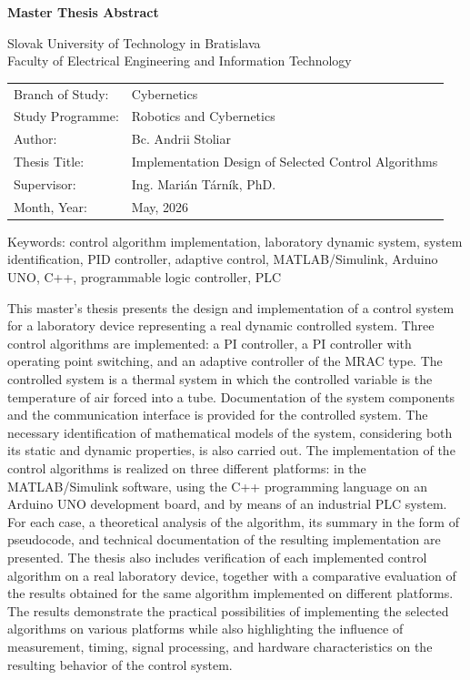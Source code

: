 \thispagestyle{empty}

\noindent 
\textsf{\textbf{\Large Master Thesis Abstract}}

\medskip


\noindent
Slovak University of Technology in Bratislava\\
Faculty of Electrical Engineering and Information Technology

\bigskip
\noindent
\begin{tabular}{@{}l l}
Branch of Study: & Cybernetics \\
Study Programme: & Robotics and Cybernetics \\
Author: & Bc. Andrii Stoliar \\
Thesis Title: & Implementation Design of Selected Control Algorithms \\
Supervisor: & Ing. Marián Tárník, PhD. \\
Month, Year: & May, 2026 \\
\end{tabular}

\bigskip
\noindent
Keywords: control algorithm implementation, laboratory dynamic system, system identification, PID controller, adaptive control, MATLAB/Simulink, Arduino UNO, C++, programmable logic controller, PLC

\bigskip
\noindent
This master’s thesis presents the design and implementation of a control system for a laboratory device representing a real dynamic controlled system. Three control algorithms are implemented: a PI controller, a PI controller with operating point switching, and an adaptive controller of the MRAC type. The controlled system is a thermal system in which the controlled variable is the temperature of air forced into a tube. Documentation of the system components and the communication interface is provided for the controlled system. The necessary identification of mathematical models of the system, considering both its static and dynamic properties, is also carried out.
The implementation of the control algorithms is realized on three different platforms: in the MATLAB/Simulink software, using the C++ programming language on an Arduino UNO development board, and by means of an industrial PLC system. For each case, a theoretical analysis of the algorithm, its summary in the form of pseudocode, and technical documentation of the resulting implementation are presented. The thesis also includes verification of each implemented control algorithm on a real laboratory device, together with a comparative evaluation of the results obtained for the same algorithm implemented on different platforms.
The results demonstrate the practical possibilities of implementing the selected algorithms on various platforms while also highlighting the influence of measurement, timing, signal processing, and hardware characteristics on the resulting behavior of the control system.





\pagebreak